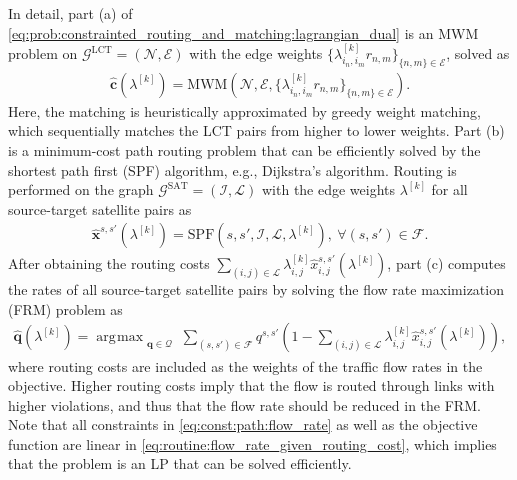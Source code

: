 \documentclass[journal]{IEEEtran}
\DeclareMathOperator*{\argmax}{\arg\!\max}
\begin{document}
In detail, part (a) of \eqref{eq:prob:constrainted_routing_and_matching:lagrangian_dual} is an MWM problem on $\mathcal{G}^\text{LCT}=(\mathcal{N},\mathcal{E})$ with the edge weights $ \{\lambda^{[k]}_{i_n,i_m}r_{n,m}\}_{\{n,m\}\in\mathcal{E}}$, solved as
\begin{equation}\label{eq:routine:mwm_given_lambda}
  \begin{aligned}
    \hat{\mathbf{c}}(\lambda^{[k]}) = \mathrm{MWM}(\mathcal{N}, \mathcal{E}, \{\lambda^{[k]}_{i_n,i_m}r_{n,m}\}_{\{n,m\}\in\mathcal{E}}).
  \end{aligned}
\end{equation}
Here, the matching is heuristically approximated by greedy weight matching, which sequentially matches the LCT pairs from higher to lower weights.
Part (b) is a minimum-cost path routing problem that can be efficiently solved by the shortest path first (SPF) algorithm, e.g., Dijkstra's algorithm.
Routing is performed on the graph $\mathcal{G}^\text{SAT}=(\mathcal{I}, \mathcal{L})$ with the edge weights $\lambda^{[k]}$ for all source-target satellite pairs as
\begin{equation}\label{eq:routine:spf_given_lambda}
  \begin{aligned}
    \hat{\mathbf{x}}^{s,s'}(\lambda^{[k]}) = \mathrm{SPF}(s,s',\mathcal{I}, \mathcal{L}, \lambda^{[k]}),\ \forall (s,s')\in\mathcal{F}.
  \end{aligned}
\end{equation}
After obtaining the routing costs $\sum_{(i,j)\in\mathcal{L}}\lambda^{[k]}_{i,j} \hat{x}^{s,s'}_{i,j} (\lambda^{[k]})$, part (c) computes the rates of all source-target satellite pairs by solving the flow rate maximization (FRM) problem as
\begin{equation}\label{eq:routine:flow_rate_given_routing_cost}
  \begin{aligned}
    \hat{\mathbf{q}}(\lambda^{[k]}) = \argmax_{
        \substack{
          \mathbf{q}\in\mathcal{Q}
        }
      }
      \sum_{(s,s')\in\mathcal{F} } q^{s,s'} (1 - \sum_{(i,j)\in\mathcal{L}}\lambda^{[k]}_{i,j} \hat{x}^{s,s'}_{i,j} (\lambda^{[k]})),
  \end{aligned}
\end{equation}
where routing costs are included as the weights of the traffic flow rates in the objective. Higher routing costs imply that the flow is routed through links with higher violations, and thus that the flow rate should be reduced in the FRM.
Note that all constraints in \eqref{eq:const:path:flow_rate} as well as the objective function are linear in \eqref{eq:routine:flow_rate_given_routing_cost}, which implies that the problem is an LP that can be solved efficiently.
\end{document}
